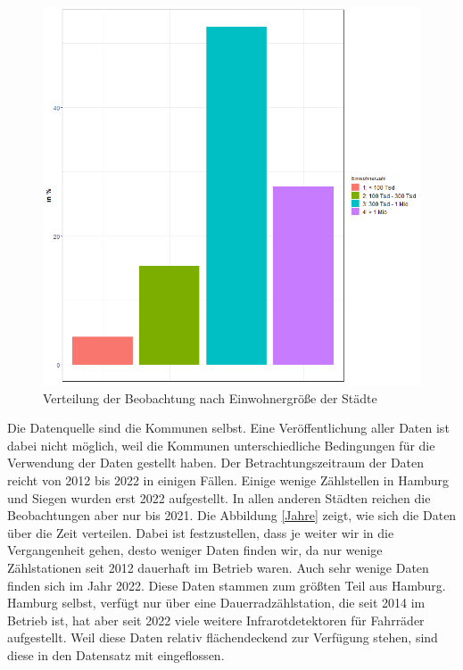 \documentclass[a4paper,12pt]{thesis}
\begin{document}
\begin{figure}[!ht]
	\centering
	\includegraphics[width=\textwidth]{Plots/plot10.png}
	\caption{Verteilung der Beobachtung nach Einwohnergröße der Städte}
	\label{Einwohnergroese}
\end{figure}

Die Datenquelle sind die Kommunen selbst. Eine Veröffentlichung aller Daten ist dabei nicht möglich, weil die Kommunen unterschiedliche Bedingungen für die Verwendung der Daten gestellt haben. Der Betrachtungszeitraum der Daten reicht von 2012 bis 2022 in einigen Fällen. Einige wenige Zählstellen in Hamburg und Siegen wurden erst 2022 aufgestellt. In allen anderen Städten reichen die Beobachtungen aber nur bis 2021. Die Abbildung \ref{Jahre} zeigt, wie sich die Daten über die Zeit verteilen. Dabei ist festzustellen, dass je weiter wir in die Vergangenheit gehen, desto weniger Daten finden wir, da nur wenige Zählstationen seit 2012 dauerhaft im Betrieb waren. Auch sehr wenige Daten finden sich im Jahr 2022. Diese Daten stammen zum größten Teil aus Hamburg. Hamburg selbst, verfügt nur über eine Dauerradzählstation, die seit 2014 im Betrieb ist, hat aber seit 2022 viele weitere Infrarotdetektoren für Fahrräder aufgestellt. Weil diese Daten relativ flächendeckend zur Verfügung stehen, sind diese in den Datensatz mit eingeflossen.
\end{document}
